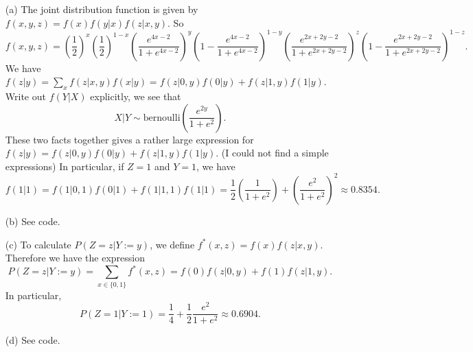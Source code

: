 \begin{itemize}
    \item[(a)] The joint distribution function is given by $f(x, y, z) = f(x) f(y|x) f(z|x, y)$.
        So
        \begin{equation*}
            f(x,y,z) = \left(\frac{1}{2}\right)^x \left(\frac{1}{2}\right)^{1 - x}
                \left(\frac{e^{4x-2}}{1 + e^{4x-2}}\right)^y \left(1 - \frac{e^{4x-2}}{1 + e^{4x-2}}\right)^{1-y}
                \left(\frac{e^{2x + 2y - 2}}{1 + e^{2x + 2y - 2}}\right)^z \left(1 - \frac{e^{2x + 2y - 2}}{1 + e^{2x + 2y - 2}}\right)^{1-z}.
        \end{equation*}
        We have $f(z|y) = \sum_{x} f(z|x,y)f(x|y) = f(z|0,y)f(0|y) + f(z|1,y)f(1|y)$.
        Write out $f(Y|X)$ explicitly, we see that
        \begin{equation*}
            X|Y \sim \mathrm{bernoulli}\left(\frac{e^{2y}}{1 + e^2}\right).
        \end{equation*}
        These two facts together gives a rather large expression for $f(z|y) = f(z|0,y)f(0|y) + f(z|1,y)f(1|y)$. (I could not find a simple expressions)
        In particular, if $Z = 1$ and $Y = 1$, we have
        \begin{equation*}
            f(1|1) = f(1|0,1)f(0|1) + f(1|1,1)f(1|1)
                = \frac{1}{2}\left(\frac{1}{1 + e^2}\right) + \left(\frac{e^2}{1 + e^2}\right)^2
                \approx 0.8354.
        \end{equation*}
    \item[(b)] See code.
    \item[(c)] To calculate $P(Z=z|Y:=y)$, we define $f^*(x, z) = f(x)f(z|x,y)$.
        Therefore we have the expression
        \begin{equation*}
            P(Z=z|Y:=y) = \sum_{x \in \{0, 1\}} f^*(x, z)
                = f(0) f(z|0,y) + f(1) f(z|1,y).
        \end{equation*}
        In particular,
        \begin{equation*}
            P(Z=1|Y:=1) = \frac{1}{4} + \frac{1}{2} \frac{e^2}{1 + e^2}
                \approx 0.6904.
        \end{equation*}
    \item[(d)] See code.
\end{itemize}

